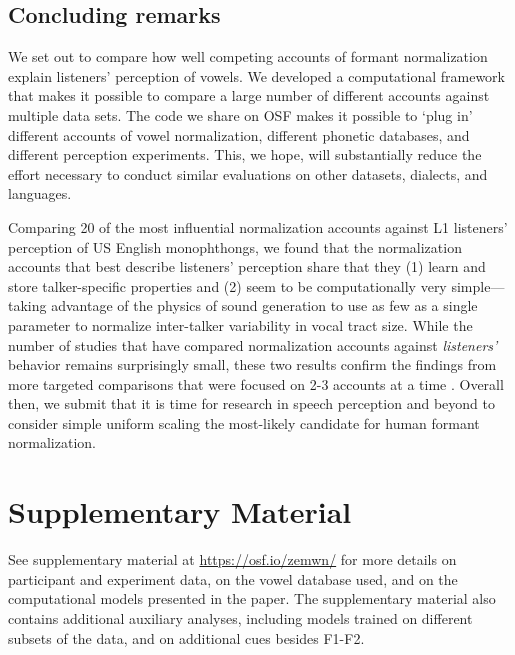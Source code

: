 \documentclass[preprint]{JASA}
\begin{document}
\subsection{Concluding remarks}\label{concluding-remarks}

We set out to compare how well competing accounts of formant normalization explain listeners' perception of vowels. We developed a computational framework that makes it possible to compare a large number of different accounts against multiple data sets. The code we share on OSF makes it possible to `plug in' different accounts of vowel normalization, different phonetic databases, and different perception experiments. This, we hope, will substantially reduce the effort necessary to conduct similar evaluations on other datasets, dialects, and languages.

Comparing 20 of the most influential normalization accounts against L1 listeners' perception of US English monophthongs, we found that the normalization accounts that best describe listeners' perception share that they (1) learn and store talker-specific properties and (2) seem to be computationally very simple---taking advantage of the physics of sound generation to use as few as a single parameter to normalize inter-talker variability in vocal tract size. While the number of studies that have compared normalization accounts against \emph{listeners'} behavior remains surprisingly small, these two results confirm the findings from more targeted comparisons that were focused on 2-3 accounts at a time \citep{barreda2021, nearey1989, richter2017}. Overall then, we submit that it is time for research in speech perception and beyond to consider simple uniform scaling the most-likely candidate for human formant normalization.

\section*{Supplementary Material}\label{supplementary-material}

See supplementary material at \url{https://osf.io/zemwn/} for more details on participant and experiment data, on the vowel database used, and on the computational models presented in the paper. The supplementary material also contains additional auxiliary analyses, including models trained on different subsets of the data, and on additional cues besides F1-F2.
\end{document}
